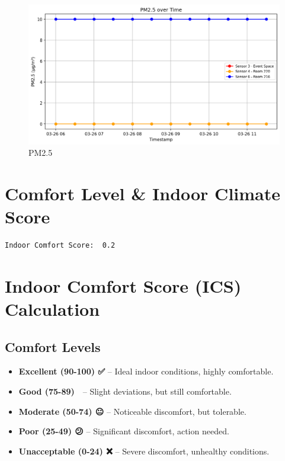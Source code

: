 \documentclass[
  12pt,
  letterpaper,
]{article}
\providecommand{\tightlist}{%
  \setlength{\itemsep}{0pt}\setlength{\parskip}{0pt}}\usepackage{longtable,booktabs,array}
\begin{document}
\begin{figure}[H]

{\centering \includegraphics[width=0.85\linewidth,height=\textheight,keepaspectratio]{./charts/pm_chart.png}

}

\caption{PM2.5}

\end{figure}%

\section{Comfort Level \& Indoor Climate
Score}\label{comfort-level-indoor-climate-score}

\begin{verbatim}
Indoor Comfort Score:  0.2
\end{verbatim}

\section{\texorpdfstring{\textbf{Indoor Comfort Score (ICS)
Calculation}}{Indoor Comfort Score (ICS) Calculation}}\label{indoor-comfort-score-ics-calculation}

\subsection{\texorpdfstring{\textbf{Comfort
Levels}}{Comfort Levels}}\label{comfort-levels}

\begin{itemize}
\tightlist
\item
  \textbf{Excellent (90-100) ✅} -- Ideal indoor conditions, highly
  comfortable.\\
\item
  \textbf{Good (75-89) 🙂} -- Slight deviations, but still
  comfortable.\\
\item
  \textbf{Moderate (50-74) 😐} -- Noticeable discomfort, but
  tolerable.\\
\item
  \textbf{Poor (25-49) 😕} -- Significant discomfort, action needed.\\
\item
  \textbf{Unacceptable (0-24) ❌} -- Severe discomfort, unhealthy
  conditions.
\end{itemize}
\end{document}
